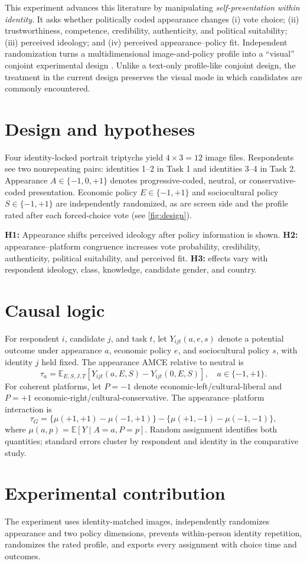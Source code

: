 \documentclass[10pt]{article}
\newcommand{\sectionbar}[1]{%
  \section*{\color{ink}#1}\vspace{-4pt}}
\newcommand{\tightcite}[1]{\citep{#1}}
\begin{document}
This experiment advances this literature by manipulating \emph{self-presentation within identity}. It asks whether politically coded appearance changes (i) vote choice; (ii) trustworthiness, competence, credibility, authenticity, and political suitability; (iii) perceived ideology; and (iv) perceived appearance--policy fit. Independent randomization turns a multidimensional image-and-policy profile into a ``visual'' conjoint experimental design \tightcite{hainmueller2014,vecchiato2025}. Unlike a text-only profile-like conjoint design, the treatment in the current design preserves the visual mode in which candidates are commonly encountered.

\sectionbar{Design and hypotheses}
Four identity-locked portrait triptychs yield $4\times3=12$ image files. Respondents see two nonrepeating pairs: identities 1--2 in Task 1 and identities 3--4 in Task 2. Appearance $A\in\{-1,0,+1\}$ denotes progressive-coded, neutral, or conservative-coded presentation. Economic policy $E\in\{-1,+1\}$ and sociocultural policy $S\in\{-1,+1\}$ are independently randomized, as are screen side and the profile rated after each forced-choice vote (see \autoref{fig:design}).

\textbf{H1:} Appearance shifts perceived ideology after policy information is shown. \textbf{H2:} appearance--platform congruence increases vote probability, credibility, authenticity, political suitability, and perceived fit. \textbf{H3:} effects vary with respondent ideology, class, knowledge, candidate gender, and country.


\sectionbar{Causal logic}
For respondent $i$, candidate $j$, and task $t$, let $Y_{ijt}(a,e,s)$ denote a potential outcome under appearance $a$, economic policy $e$, and sociocultural policy $s$, with identity $j$ held fixed. The appearance AMCE relative to neutral is
\[
\tau_a=\mathbb{E}_{E,S,J,T}\!\left[Y_{ijt}(a,E,S)-Y_{ijt}(0,E,S)\right],\quad a\in\{-1,+1\}.
\]
For coherent platforms, let $P=-1$ denote economic-left/cultural-liberal and $P=+1$ economic-right/cultural-conservative. The appearance--platform interaction is
\[
\tau_{G}=\{\mu(+1,+1)-\mu(-1,+1)\}
-\{\mu(+1,-1)-\mu(-1,-1)\},
\]
where $\mu(a,p)=\mathbb{E}[Y\mid A=a,P=p]$. Random assignment identifies both quantities; standard errors cluster by respondent and identity in the comparative study.

\sectionbar{Experimental contribution}
The experiment uses identity-matched images, independently randomizes appearance and two policy dimensions, prevents within-person identity repetition, randomizes the rated profile, and exports every assignment with choice time and outcomes. 
\end{document}
